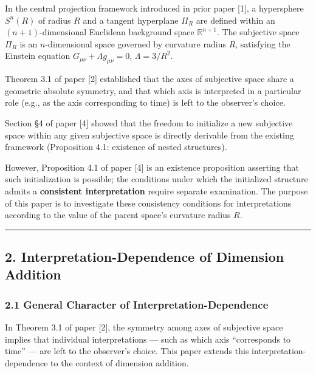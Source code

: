 \documentclass[a4paper,11pt]{article}
\theoremstyle{definition}
\begin{document}
In the central projection framework introduced in prior paper {[}1{]}, a hypersphere \(S^n(R)\) of radius \(R\) and a tangent hyperplane \(\Pi_R\) are defined within an \((n+1)\)-dimensional Euclidean background space \(\mathbb{R}^{n+1}\). The subjective space \(\Pi_R\) is an \(n\)-dimensional space governed by curvature radius \(R\), satisfying the Einstein equation \(G_{\mu\nu} + \Lambda g_{\mu\nu} = 0\), \(\Lambda = 3/R^2\).

Theorem 3.1 of paper {[}2{]} established that the axes of subjective space share a geometric absolute symmetry, and that which axis is interpreted in a particular role (e.g., as the axis corresponding to time) is left to the observer's choice.

Section §4 of paper {[}4{]} showed that the freedom to initialize a new subjective space within any given subjective space is directly derivable from the existing framework (Proposition 4.1: existence of nested structures).

However, Proposition 4.1 of paper {[}4{]} is an existence proposition asserting that such initialization is possible; the conditions under which the initialized structure admits a \textbf{consistent interpretation} require separate examination. The purpose of this paper is to investigate these consistency conditions for interpretations according to the value of the parent space's curvature radius \(R\).

\begin{center}\rule{0.5\linewidth}{0.5pt}\end{center}

\subsection{2. Interpretation-Dependence of Dimension Addition}\label{interpretation-dependence-of-dimension-addition}

\subsubsection{2.1 General Character of Interpretation-Dependence}\label{general-character-of-interpretation-dependence}

In Theorem 3.1 of paper {[}2{]}, the symmetry among axes of subjective space implies that individual interpretations --- such as which axis ``corresponds to time'' --- are left to the observer's choice. This paper extends this interpretation-dependence to the context of dimension addition.
\end{document}

